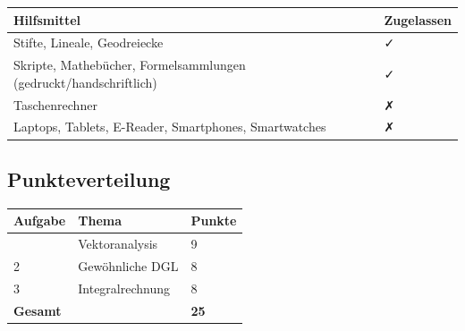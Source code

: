 \documentclass[11pt, a4paper]{article}
\begin{document}
{\small
\begin{tabularx}{\linewidth}{XX}
\hline
\rowcolor{tableheadbg}
{\color{white}\textbf{Hilfsmittel}} & {\color{white}\textbf{Zugelassen}} \\[2pt]
\hline
\endhead
\hline
\endfoot
Stifte, Lineale, Geodreiecke & ✓ \\
Skripte, Mathebücher, Formelsammlungen (gedruckt/handschriftlich) & ✓ \\
Taschenrechner & ✗ \\
Laptops, Tablets, E-Reader, Smartphones, Smartwatches & ✗ \\
\end{tabularx}
}



\subsection{Punkteverteilung}

{\small
\begin{tabularx}{\linewidth}{XXX}
\hline
\rowcolor{tableheadbg}
{\color{white}\textbf{Aufgabe}} & {\color{white}\textbf{Thema}} & {\color{white}\textbf{Punkte}} \\[2pt]
\hline
\endhead
\hline
\endfoot
1 & Vektoranalysis & 9 \\
2 & Gewöhnliche DGL & 8 \\
3 & Integralrechnung & 8 \\
\textbf{Gesamt} &  & \textbf{25} \\
\end{tabularx}
}





\end{document}
